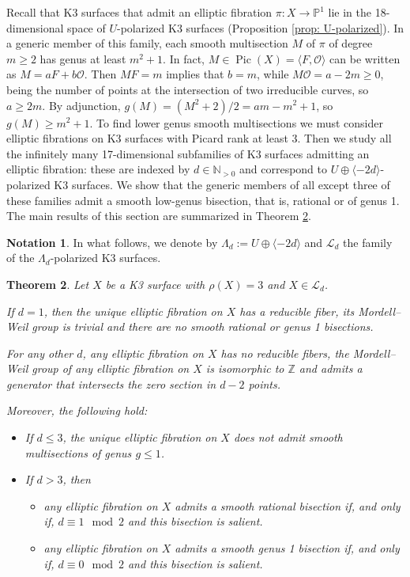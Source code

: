 \documentclass{amsart}
\newtheorem{theorem}{Theorem}[section]
\theoremstyle{definition}
\newtheorem{notation}[theorem]{Notation}
\numberwithin{equation}{section}
\newcommand{\ra}{\rightarrow}
\newcommand{\Z}{\mathbb{Z}}
\renewcommand{\O}{\mathcal{O}}
\DeclareMathOperator{\Pic}{Pic}
\begin{document}
Recall that K3 surfaces that admit an elliptic fibration $\pi:X\ra\mathbb{P}^1$ lie in the 18-dimensional space of $U$-polarized K3 surfaces (Proposition \ref{prop: U-polarized}). In a generic member of this family, each smooth multisection $M$ of $\pi$ of degree $m\geq 2$ has genus at least $m^2+1$. In fact, $M\in\Pic(X)=\langle F,\mathcal{O}\rangle$ can be written as $M=aF+b\O$. Then $MF=m$ implies that $b=m$, while $M\O=a-2m\geq 0$, being the number of points at the intersection of two irreducible curves, so $a\geq 2m$. By adjunction, $g(M)=(M^2+2)/2=am-m^2+1$, so $g(M)\geq m^2+1$. To find lower genus smooth multisections we must consider elliptic fibrations on K3 surfaces with Picard rank at least 3. Then we study all the infinitely many 17-dimensional subfamilies of K3 surfaces admitting an elliptic fibration: these are indexed by $d\in\mathbb{N}_{>0}$ and correspond to $U\oplus \langle -2d \rangle$-polarized K3 surfaces. We show that the generic members of all except three of these families admit a smooth low-genus bisection, that is, rational or of genus 1. The main results of this section are summarized in Theorem \ref{theorem:Picard3}.

\begin{notation}\label{notation Lambdad and Ld}
In what follows, we denote by $\Lambda_d:=U\oplus \langle -2d\rangle$ and $\mathcal{L}_d$ the family of the $\Lambda_d$-polarized K3 surfaces.
\end{notation}

\begin{theorem}\label{theorem:Picard3}
Let $X$ be a K3 surface with $\rho(X)=3$ and $X\in\mathcal{L}_d$. 

If $d=1$, then the unique elliptic fibration on $X$ has a reducible fiber, its Mordell--Weil group is trivial and there are no smooth rational or genus 1 bisections. 

For any other $d$, any elliptic fibration on $X$ has no reducible fibers, the Mordell--Weil group of any elliptic fibration on $X$ is isomorphic to $\Z$ and admits a generator that intersects the zero section in $d-2$ points. 

Moreover, the following hold:

\begin{itemize}
\item[a)] If $d\leq 3$, the unique elliptic fibration on $X$ does not admit smooth multisections of genus $g\leq 1$.

\item[b)] If $d>3$, then
\begin{itemize}
\item
any elliptic fibration on $X$ admits a smooth rational bisection if, and only if, $d\equiv 1\mod 2$ and this bisection is salient. 
\item any elliptic fibration on $X$ admits a smooth genus 1 bisection if, and only if, $d\equiv 0 \mod 2$ and this bisection is salient. 
\end{itemize}
\end{itemize}
\end{theorem}
\end{document}
